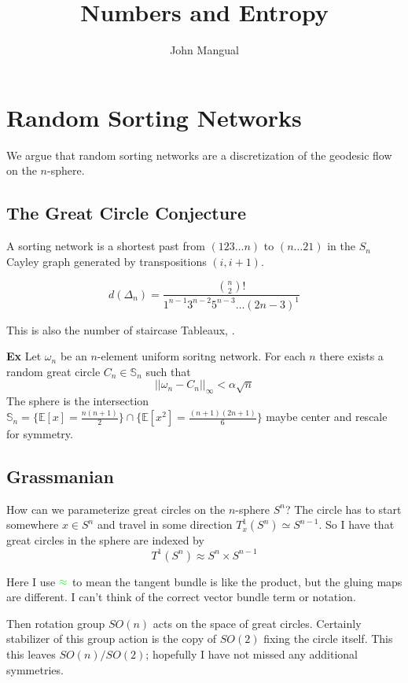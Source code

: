 \documentclass[12pt]{article}
\title{Numbers and Entropy}
\author{John Mangual}
\date{}
\begin{document}
{\selectfont

\maketitle

\section{Random Sorting Networks}

We argue that random sorting networks are a discretization of the geodesic flow on the $n$-sphere.

\subsection{The Great Circle Conjecture}

A sorting network is a shortest past from $(123\dots n)$ to $(n\dots 21)$ in the $S_n$ Cayley graph generated by transpositions $(i,i+1)$.  

$$ d(\Delta_n) = \frac{\binom{n}{2}!}{1^{n-1}3^{n-2}5^{n-3} \dots (2n-3)^1}$$

\noindent This is also the number of staircase Tableaux, \cite{St}. \newline

\noindent \textbf{Ex} Let $\omega_n$ be an $n$-element uniform soritng network.  For each $n$ there exists a random great circle $C_n \in \mathbb{S}_n$ such that $$ || \omega_n - C_n ||_\infty < \alpha \sqrt{n} $$
The sphere is the intersection $\mathbb{S}_n = \big\{\mathbb{E}[x] = \frac{n (n+1)}{2} \big\} \cap \big \{ \mathbb{E}[x^2] = \frac{(n+1)(2n+1)}{6} \big\} $ maybe center and rescale for symmetry. 

\subsection{Grassmanian}
How can we parameterize great circles on the $n$-sphere $S^n$?  The circle has to start somewhere $x \in S^n$ and travel in some direction $T_x^1(S^n)\simeq S^{n-1}$.   So I have that great circles in the sphere are indexed by $$T^1(S^n)\approx S^n \times S^{n-1} $$

\noindent Here I use $\color{green}{\approx}$ to mean the tangent bundle is like the product, but the gluing maps are different.  I can't think of the correct vector bundle term or notation. \newline

\noindent Then rotation group $SO(n)$ acts on the space of great circles.  Certainly stabilizer of this group action is the copy of $SO(2)$ fixing the circle itself.  This this leaves $SO(n)/SO(2)$; hopefully I have not missed any additional symmetries.  \newline

}
\end{document}
